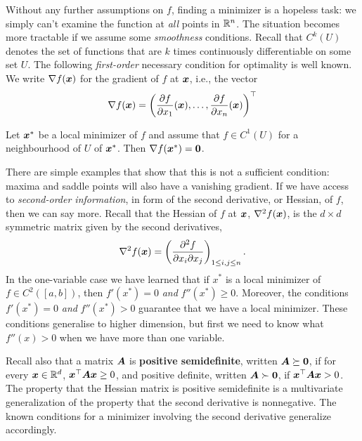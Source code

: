 Without any further assumptions on $f$, finding a minimizer is a hopeless task: we simply can't examine the function at {\em all} points in $\mathbb{R}^n$. 
The situation becomes more tractable if we assume some {\em smoothness} conditions. Recall that $C^k(U)$ denotes the set of functions that are $k$ times continuously differentiable on some set $U$. The following {\em first-order} necessary condition for optimality is well known. We write $\nabla f(\bm{x})$ for the gradient of $f$ at $\bm{x}$, i.e., the vector 
\begin{equation*}
 \nabla f(\bm{x}) = \left(\frac{\partial f}{\partial x_1}(\bm{x}),\dots,\frac{\partial f}{\partial x_n}(\bm{x})\right)^{\top}
\end{equation*}


\begin{theorem}
 Let $\bm{x}^*$ be a local minimizer of $f$ and assume that $f\in C^1(U)$ for a neighbourhood of $U$ of $\bm{x}^*$. Then $\nabla f(\bm{x}^*) = \bm{0}$. 
\end{theorem}

There are simple examples that show that this is not a sufficient condition: maxima and saddle points will also have a vanishing gradient. If we have access to {\em second-order information}, in form of the second derivative, or Hessian, of $f$, then we can say more. Recall that the Hessian of $f$ at $\bm{x}$, $\nabla^2f(\bm{x})$, is the $d\times d$ symmetric matrix given by the second derivatives,
\begin{equation*}
 \nabla^2f(\bm{x}) = \left(\frac{\partial^2 f}{\partial x_i \partial x_j}\right)_{1\leq i,j\leq n}.
\end{equation*}
In the one-variable case we have learned that if $x^*$ is a local minimizer of $f\in C^2([a,b])$, then $f'(x^*)=0$ {\em and} $f''(x^*)\geq 0$. Moreover, the conditions $f'(x^*)=0$ {\em and} $f''(x^*)>0$ guarantee that we have a local minimizer. These conditions generalise to higher dimension, but first we need to know what $f''(x)>0$ when we have more than one variable.

Recall also that a matrix $\bm{A}$ is \textbf{positive semidefinite}, written $\bm{A}\succeq \bm{0}$, if for every $\bm{x}\in \mathbb{R}^d$, $\bm{x}^{\top}\bm{A}\bm{x}\geq 0$, and positive definite, written $\bm{A}\succ \bm{0}$, if $\bm{x}^{\top}\bm{A}\bm{x}>0$. The property that the Hessian matrix is positive semidefinite is a multivariate generalization of the property that the second derivative is nonnegative. The known conditions for a minimizer involving the second derivative generalize accordingly.

